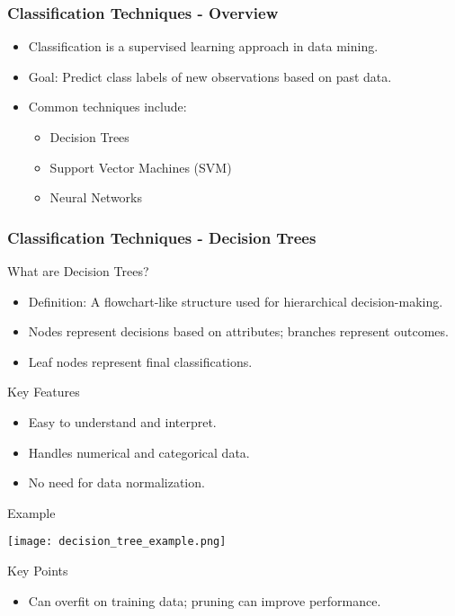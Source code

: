 \documentclass[aspectratio=169]{beamer}
\begin{document}
\begin{frame}[fragile]
    \frametitle{Classification Techniques - Overview}
    \begin{itemize}
        \item Classification is a supervised learning approach in data mining.
        \item Goal: Predict class labels of new observations based on past data.
        \item Common techniques include:
        \begin{itemize}
            \item Decision Trees
            \item Support Vector Machines (SVM)
            \item Neural Networks
        \end{itemize}
    \end{itemize}
\end{frame}

\begin{frame}[fragile]
    \frametitle{Classification Techniques - Decision Trees}
    \begin{block}{What are Decision Trees?}
        \begin{itemize}
            \item Definition: A flowchart-like structure used for hierarchical decision-making.
            \item Nodes represent decisions based on attributes; branches represent outcomes.
            \item Leaf nodes represent final classifications.
        \end{itemize}
    \end{block}

    \begin{block}{Key Features}
        \begin{itemize}
            \item Easy to understand and interpret.
            \item Handles numerical and categorical data.
            \item No need for data normalization.
        \end{itemize}
    \end{block}

    \begin{block}{Example}
        \begin{center}
            \texttt{[image: decision\_tree\_example.png]}
        \end{center}
    \end{block}
    
    \begin{block}{Key Points}
        \begin{itemize}
            \item Can overfit on training data; pruning can improve performance.
        \end{itemize}
    \end{block}
\end{frame}
\end{document}
